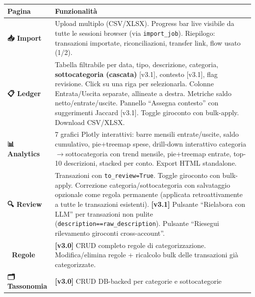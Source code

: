 \documentclass[11pt, a4paper]{article}
\begin{document}
\begin{center}
\small
\begin{longtable}{@{}L{3cm} L{10.5cm}@{}}
\toprule
\textbf{Pagina} & \textbf{Funzionalità} \\
\midrule
\endhead
\textbf{📥 Import}        & Upload multiplo (CSV/XLSX). Progress bar live visibile da tutte
                             le sessioni browser (via \texttt{import\_job}). Riepilogo:
                             transazioni importate, riconciliazioni, transfer link, flow
                             usato (1/2). \\[4pt]
\textbf{📋 Ledger}        & Tabella filtrabile per data, tipo, descrizione, categoria,
                             \textbf{sottocategoria (cascata)} [v3.1], contesto [v3.1],
                             flag revisione. Click su una riga per selezionarla. Colonne
                             Entrata/Uscita separate, allineate a destra. Metriche saldo
                             netto/entrate/uscite. Pannello ``Assegna contesto'' con
                             suggerimenti Jaccard [v3.1]. Toggle giroconto con bulk-apply.
                             Download CSV/XLSX. \\[4pt]
\textbf{📊 Analytics}     & 7 grafici Plotly interattivi: barre mensili entrate/uscite,
                             saldo cumulativo, pie+treemap spese, drill-down interattivo
                             categoria$\to$sottocategoria con trend mensile, pie+treemap
                             entrate, top-10 descrizioni, stacked per conto. Export HTML
                             standalone. \\[4pt]
\textbf{🔍 Review}        & Transazioni con \texttt{to\_review=True}. Toggle giroconto
                             con bulk-apply. Correzione categoria/sottocategoria con
                             salvataggio opzionale come regola permanente (applicata
                             retroattivamente a tutte le transazioni esistenti).
                             \textbf{[v3.1]} Pulsante ``Rielabora con LLM'' per
                             transazioni non pulite (\texttt{description==raw\_description}).
                             Pulsante ``Riesegui rilevamento giroconti cross-account''. \\[4pt]
\textbf{📏 Regole}        & \textbf{[v3.0]} CRUD completo regole di categorizzazione.
                             Modifica/elimina regole + ricalcolo bulk delle transazioni
                             già categorizzate. \\[4pt]
\textbf{🗂️ Tassonomia}  & \textbf{[v3.0]} CRUD DB-backed per categorie e sottocategorie

\end{longtable}
\end{center}
\end{document}
